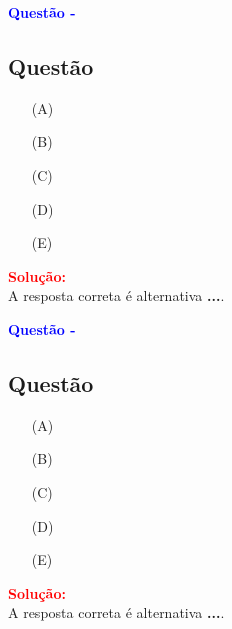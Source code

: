 \begin{flushleft}
\textbf{\textcolor{blue}{\Large Quest\~ao - }}\\
\noindent

\subsection{Quest\~ao }

\begin{itemize}
\item[(A)] 
\item[(B)] 
\item[(C)]
\item[(D)] 
\item[(E)] 
\end{itemize}

\vspace{0.5cm}

\textcolor{red}{\textbf{Solução:}}\\


A resposta correta é alternativa \colorbox{green!50}{\textbf{...}}.

\end{flushleft}


\begin{flushleft}
\textbf{\textcolor{blue}{\Large Quest\~ao - }}\\
\noindent

\subsection{Quest\~ao }

\begin{itemize}
\item[(A)] 
\item[(B)] 
\item[(C)]
\item[(D)] 
\item[(E)] 
\end{itemize}

\vspace{0.5cm}

\textcolor{red}{\textbf{Solução:}}\\


A resposta correta é alternativa \colorbox{green!50}{\textbf{...}}.


\end{flushleft}
